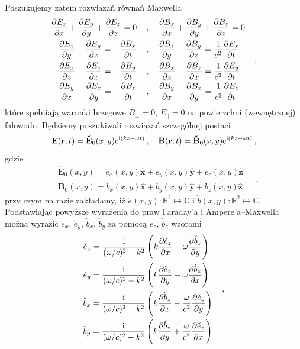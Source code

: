 \documentclass[../main.tex]{subfiles}
\begin{document}
Poszukujemy zatem rozwiązań równań Maxwella
\begin{equation*}
    \begin{split}
        \pdv{E_x}{x}+\pdv{E_y}{y}+\pdv{E_z}{z}=0\quad&\,,\quad \pdv{B_x}{x}+\pdv{B_y}{y}+\pdv{B_z}{z}=0\\
        \pdv{E_z}{y}-\pdv{E_y}{z}=-\pdv{B_x}{t}\quad&\,, \quad \pdv{B_z}{y}-\pdv{B_y}{z}=\frac{1}{c^2}\pdv{E_x}{t}\\
        \pdv{E_x}{z}-\pdv{E_z}{x}=-\pdv{B_y}{t}\quad&\,, \quad \pdv{B_x}{z}-\pdv{B_z}{x}=\frac{1}{c^2}\pdv{E_y}{t}\\
        \pdv{E_y}{x}-\pdv{E_x}{y}=-\pdv{B_z}{t}\quad&\,, \quad \pdv{B_y}{x}-\pdv{B_x}{y}=\frac{1}{c^2}\pdv{E_z}{t}
    \end{split}\quad\,,
\end{equation*}
które spełniają warunki brzegowe \(B_\perp=0\), \(E_\parallel=0\) na powierzchni (wewnętrznej)
falowodu. Będziemy poszukiwali rozwiązań szczególnej postaci
\begin{equation*}
    \mathbf{E}(\mathbf{r},t)=\mathbf{\check E}_0(x,y)\mathrm{e}^{\mathrm{i}(kz-\omega t)}\,,\quad \mathbf{B}(\mathbf{r},t)=\mathbf{\check B}_0(x,y)\mathrm{e}^{\mathrm{i}(kz-\omega t)}\,,
\end{equation*}
gdzie
\begin{equation*}
    \begin{split}
        &\mathbf{\check E}_0(x,y)=\check e_x(x,y)\mathbf{\hat{x}}+\check e_y(x,y)\mathbf{\hat{y}}+\check e_z(x,y)\mathbf{\hat{z}}\\
        &\mathbf{\check B}_0(x,y)=\check b_x(x,y)\mathbf{\hat{x}}+\check b_y(x,y)\mathbf{\hat{y}}+\check b_z(x,y)\mathbf{\hat{z}}
    \end{split}\quad\,,
\end{equation*}
przy czym na razie zakładamy, iż \(\check e(x,y):\mathbb{R}^2\mapsto\mathbb{C}\) i \(\check
b(x,y):\mathbb{R}^2\mapsto\mathbb{C}\). Podstawiając powyższe wyrażenia do praw Faraday'a i
Ampere'a--Maxwella można wyrazić \(\check e_x\), \(\check e_y\), \(\check b_x\), \(\check b_y\) za
pomocą \(\check e_z\), \(\check b_z\) wzorami
\begin{equation*}
    \begin{split}
        &\check e_x=\frac{\mathrm{i}}{(\omega/c)^2-k^2}\left(k\pdv{\check e_z}{x}+\omega\pdv{\check b_z}{y}\right)\\
        &\check e_y=\frac{\mathrm{i}}{(\omega/c)^2-k^2}\left(k\pdv{\check e_z}{y}-\omega\pdv{\check b_z}{x}\right)\\
        &\check b_x=\frac{\mathrm{i}}{(\omega/c)^2-k^2}\left(k\pdv{\check b_z}{x}-\frac{\omega}{c^2}\pdv{\check e_z}{y}\right)\\
        &\check b_y=\frac{\mathrm{i}}{(\omega/c)^2-k^2}\left(k\pdv{\check b_z}{y}+\frac{\omega}{c^2}\pdv{\check e_z}{x}\right)\\
    \end{split}\quad\,,
\end{equation*}
\end{document}
